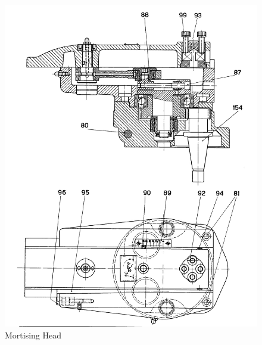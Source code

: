\newpage
\begin{figure}[h]
    \centering
    \includegraphics[width=1.0\linewidth]{images/page_39}
    \caption{Mortising Head}
    \label{fig:mortising_head}
\end{figure}
